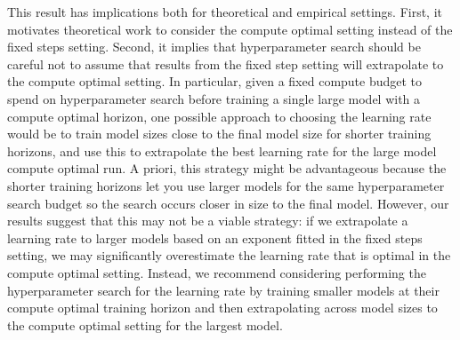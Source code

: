 \documentclass{article}
\theoremstyle{plain}
\theoremstyle{definition}
\theoremstyle{remark}
\begin{document}
This result has implications both for theoretical and empirical settings. First, it motivates theoretical work to consider the compute optimal setting instead of the fixed steps setting. Second, it implies that hyperparameter search should be careful not to assume that results from the fixed step setting will extrapolate to the compute optimal setting. In particular, given a fixed compute budget to spend on hyperparameter search before training a single large model with a compute optimal horizon, one possible approach to choosing the learning rate would be to train model sizes close to the final model size for shorter training horizons, and use this to extrapolate the best learning rate for the large model compute optimal run. A priori, this strategy might be advantageous because the shorter training horizons let you use larger models for the same hyperparameter search budget so the search occurs closer in size to the final model. However, our results suggest that this may not be a viable strategy: if we extrapolate a learning rate to larger models based on an exponent fitted in the fixed steps setting, we may significantly overestimate the learning rate that is optimal in the compute optimal setting. Instead, we recommend considering performing the hyperparameter search for the learning rate by training smaller models at their compute optimal training horizon and then extrapolating across model sizes to the compute optimal setting for the largest model.
\end{document}

